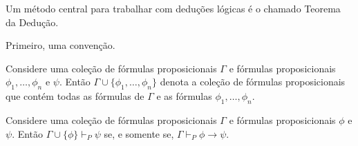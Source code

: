 Um método central para trabalhar com deduções lógicas é o chamado Teorema da Dedução.

Primeiro, uma convenção.
\begin{convention}Considere uma coleção de fórmulas proposicionais $\Gamma$ e fórmulas proposicionais $\phi_1, \dots, \phi_n$ e $\psi$.
Então $\Gamma\cup \{\phi_1, \dots, \phi_n\}$ denota a coleção de fórmulas proposicionais que contém todas as fórmulas de $\Gamma$ e as fórmulas $\phi_1, \dots, \phi_n$.
\end{convention}

\begin{metatheorem}\label{thm:teoremaDeducao}
    Considere uma coleção de fórmulas proposicionais $\Gamma$ e fórmulas proposicionais $\phi$ e $\psi$.
    Então $\Gamma \cup \{\phi\} \vdash_P \psi$ se, e somente se, $\Gamma \vdash_P \phi \rightarrow \psi$.
\end{metatheorem}
